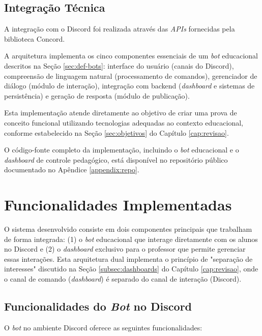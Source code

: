 \subsection{Integração Técnica}

A integração com o Discord foi realizada através das \textit{APIs} fornecidas
pela biblioteca Concord.

A arquitetura implementa os cinco componentes essenciais de um \textit{bot}
educacional descritos na Seção \ref{sec:def-bots}: interface do usuário (canais
do Discord), compreensão de linguagem natural (processamento de comandos),
gerenciador de diálogo (módulo de interação), integração com backend
(\textit{dashboard} e sistemas de persistência) e geração de resposta (módulo de
publicação).

Esta implementação atende diretamente ao objetivo de criar uma prova de conceito
funcional utilizando tecnologias adequadas ao contexto educacional, conforme
estabelecido na Seção \ref{sec:objetivos} do Capítulo \ref{cap:revisao}.

O código-fonte completo da implementação, incluindo o \textit{bot} educacional 
e o \textit{dashboard} de controle pedagógico, está disponível no repositório 
público documentado no Apêndice \ref{appendix:repo}.

\section{Funcionalidades Implementadas}
\label{sec:funcionalidades}

O sistema desenvolvido consiste em dois componentes principais que trabalham de
forma integrada: (1) o \textit{bot} educacional que interage diretamente com os
alunos no Discord e (2) o \textit{dashboard} exclusivo para o professor que
permite gerenciar essas interações. Esta arquitetura dual implementa o princípio
de "separação de interesses" discutido na Seção \ref{subsec:dashboards} do
Capítulo \ref{cap:revisao}, onde o canal de comando (\textit{dashboard}) é
separado do canal de interação (Discord).

\subsection{Funcionalidades do \textit{Bot} no Discord}
O \textit{bot} no ambiente Discord oferece as seguintes funcionalidades:

